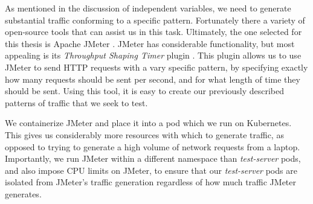 As mentioned in the discussion of independent variables, we need to generate
substantial traffic conforming to a specific pattern. Fortunately there a
variety of open-source tools that can assist us in this task. Ultimately, the
one selected for this thesis is Apache JMeter \cite{apache-jmeter}. JMeter has
considerable functionality, but most appealing is its \textit{Throughput Shaping
Timer} plugin \cite{throughput-shaping-timer-plugin}. This plugin allows us to
use JMeter to send HTTP requests with a vary specific pattern, by specifying
exactly how many requests should be sent per second, and for what length of time
they should be sent. Using this tool, it is easy to create our previously
described patterns of traffic that we seek to test.

We containerize JMeter and place it into a pod which we run on Kubernetes. This
gives us considerably more resources with which to generate traffic, as opposed
to trying to generate a high volume of network requests from a laptop.
Importantly, we run JMeter within a different namespace than
\textit{test-server} pods, and also impose CPU limits on JMeter, to ensure that
our \textit{test-server} pods are isolated from JMeter's traffic generation
regardless of how much traffic JMeter generates.
